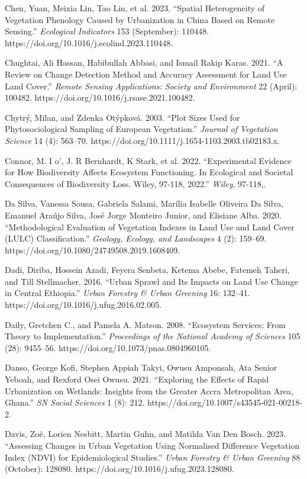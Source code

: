 Chen, Yuan, Meixia Lin, Tao Lin, et al. 2023. ``Spatial Heterogeneity of Vegetation Phenology Caused by Urbanization in China Based on Remote Sensing.'' \emph{Ecological Indicators} 153 (September): 110448. https://doi.org/10.1016/j.ecolind.2023.110448.

Chughtai, Ali Hassan, Habibullah Abbasi, and Ismail Rakip Karas. 2021. ``A Review on Change Detection Method and Accuracy Assessment for Land Use Land Cover.'' \emph{Remote Sensing Applications: Society and Environment} 22 (April): 100482. https://doi.org/10.1016/j.rsase.2021.100482.

Chytrý, Milan, and Zdenka Otýpková. 2003. ``Plot Sizes Used for Phytosociological Sampling of European Vegetation.'' \emph{Journal of Vegetation Science} 14 (4): 563--70. https://doi.org/10.1111/j.1654-1103.2003.tb02183.x.

Connor, M. I o', J. R Bernhardt, K Stark, et al. 2022. ``Experimental Evidence for How Biodiversity Affects Ecosystem Functioning. In Ecological and Societal Consequences of Biodiversity Loss. Wiley, 97-118, 2022.'' \emph{Wiley}, 97-118,.

Da Silva, Vanessa Sousa, Gabriela Salami, Marília Isabelle Oliveira Da Silva, Emanuel Araújo Silva, José Jorge Monteiro Junior, and Elisiane Alba. 2020. ``Methodological Evaluation of Vegetation Indexes in Land Use and Land Cover (LULC) Classification.'' \emph{Geology, Ecology, and Landscapes} 4 (2): 159--69. https://doi.org/10.1080/24749508.2019.1608409.

Dadi, Diriba, Hossein Azadi, Feyera Senbeta, Ketema Abebe, Fatemeh Taheri, and Till Stellmacher. 2016. ``Urban Sprawl and Its Impacts on Land Use Change in Central Ethiopia.'' \emph{Urban Forestry \& Urban Greening} 16: 132--41. https://doi.org/10.1016/j.ufug.2016.02.005.

Daily, Gretchen C., and Pamela A. Matson. 2008. ``Ecosystem Services: From Theory to Implementation.'' \emph{Proceedings of the National Academy of Sciences} 105 (28): 9455--56. https://doi.org/10.1073/pnas.0804960105.

Danso, George Kofi, Stephen Appiah Takyi, Owusu Amponsah, Ata Senior Yeboah, and Rexford Osei Owusu. 2021. ``Exploring the Effects of Rapid Urbanization on Wetlands: Insights from the Greater Accra Metropolitan Area, Ghana.'' \emph{SN Social Sciences} 1 (8): 212. https://doi.org/10.1007/s43545-021-00218-2.

Davis, Zoë, Lorien Nesbitt, Martin Guhn, and Matilda Van Den Bosch. 2023. ``Assessing Changes in Urban Vegetation Using Normalised Difference Vegetation Index (NDVI) for Epidemiological Studies.'' \emph{Urban Forestry \& Urban Greening} 88 (October): 128080. https://doi.org/10.1016/j.ufug.2023.128080.

